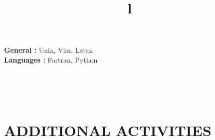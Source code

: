 \documentclass[margin]{res}
\begin{document}
\begin{resume}
\textbf{General : } Unix, Vim, Latex
\\
\textbf{Languages : } Fortran, Python

\begin{format}
\title{l}\\
\\
\body\\
\end{format}

\section{ADDITIONAL ACTIVITIES}




\end{resume}
\(\)
\end{document}
